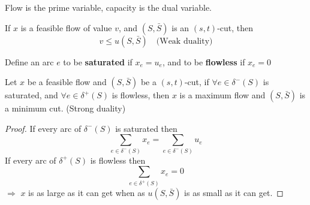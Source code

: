                 Flow is the prime variable, capacity is the dual variable.

                \begin{corollary}
                    If $x$ is a feasible flow of value $v$, and $(S, \bar{S})$ is an $(s, t)$-cut, then
                    \begin{equation*}
                        v \le u(S, \bar{S}) \quad \text{(Weak duality)}
                    \end{equation*}
                \end{corollary}

                \begin{definition}
                    Define an arc $e$ to be \textbf{saturated} if $x_e = u_e$, and to be \textbf{flowless} if $x_e = 0$
                \end{definition}

                \begin{corollary}
                    Let $x$ be a feasible flow and $(S, \bar{S})$ be a $(s, t)$-cut, if $\forall e\in \delta^-(S)$ is saturated, and $\forall e\in \delta^+(S)$ is flowless, then $x$ is a maximum flow and $(S, \bar{S})$ is a minimum cut. (Strong duality)
                \end{corollary}

                \begin{proof}
                    If every arc of $\delta^-(S)$ is saturated then
                    \begin{equation*}
                        \sum_{e\in \delta^-(S)}x_e = \sum_{e\in \delta^-(S)}u_e
                    \end{equation*}
                    If every arc of $\delta^+(S)$ is flowless then
                    \begin{equation*}
                        \sum_{e\in \delta^+(S)}x_e = 0
                    \end{equation*}
                    $\Rightarrow$ $x$ is as large as it can get when as $u(S, \bar{S})$ is as small as it can get.
                \end{proof}

